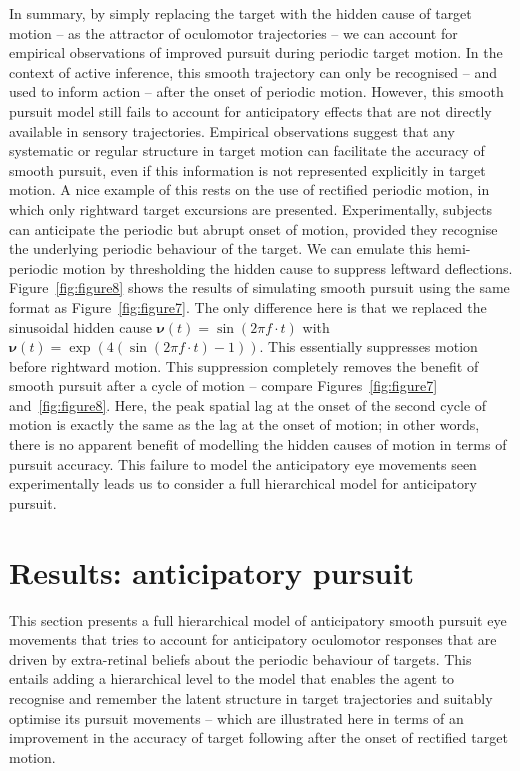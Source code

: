 \documentclass[a4paper]{article} %
\begin{document}
In summary, by simply replacing the target with the hidden cause of
target motion -- as the attractor of oculomotor trajectories -- we can
account for empirical observations of improved pursuit during periodic
target motion. In the context of active inference, this smooth
trajectory can only be recognised -- and used to inform action -- after
the onset of periodic motion. However, this smooth pursuit model still
fails to account for anticipatory effects that are not directly
available in sensory trajectories. Empirical observations suggest that
any systematic or regular structure in target motion can facilitate the
accuracy of smooth pursuit, even if this information is not represented
explicitly in target motion. A nice example of this rests on the use of
rectified periodic motion, in which only rightward target excursions are
presented. Experimentally, subjects can anticipate the periodic but
abrupt onset of motion, provided they recognise the underlying periodic
behaviour of the target. We can emulate this hemi-periodic motion by
thresholding the hidden cause to suppress leftward deflections. Figure~\ref{fig:figure8}
shows the results of simulating smooth pursuit using the same format as
Figure~\ref{fig:figure7}. The only difference here is that we replaced the sinusoidal
hidden cause
$\bm{\nu}(t) = \sin(2\pi f \cdot t)$ %
with
$\bm{\nu}(t)= \exp(4(\sin(2\pi f \cdot t)-1))$.
This essentially suppresses motion before rightward motion. This
suppression completely removes the benefit of smooth pursuit after a
cycle of motion -- compare Figures~\ref{fig:figure7} and~\ref{fig:figure8}. Here, the peak spatial lag
at the onset of the second cycle of motion is exactly the same as the
lag at the onset of motion; in other words, there is no apparent benefit
of modelling the hidden causes of motion in terms of pursuit accuracy.
This failure to model the anticipatory eye movements seen experimentally
leads us to consider a full hierarchical model for anticipatory pursuit.
\section{Results: anticipatory pursuit}
\label{sec:anticip}

This section presents a full hierarchical model of anticipatory smooth
pursuit eye movements that tries to account for anticipatory oculomotor
responses that are driven by extra-retinal beliefs about the periodic
behaviour of targets. This entails adding a hierarchical level to the
model that enables the agent to recognise and remember the latent
structure in target trajectories and suitably optimise its pursuit
movements -- which are illustrated here in terms of an improvement in
the accuracy of target following after the onset of rectified target
motion.
\end{document}
